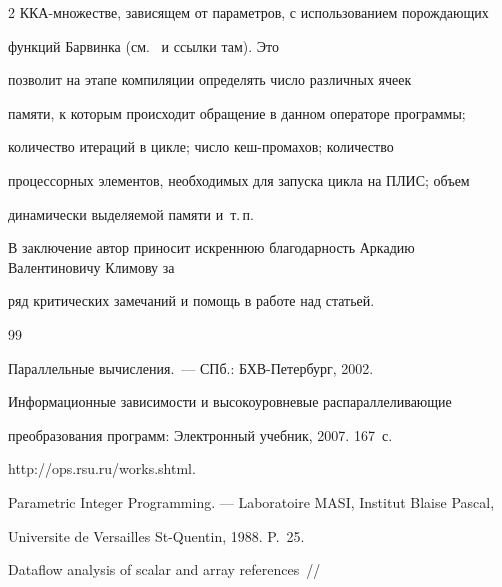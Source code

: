 \begin{multicols}{2}
ККА-мно\-жест\-ве, зависящем от параметров, с использованием порождающих

функций Барвинка (см.~\cite{Verdoolaege3} и ссылки там). Это

позволит на этапе компиляции определять чис\-ло различных ячеек

памяти, к которым происходит обращение в данном операторе программы;

количество итераций в цикле; чис\-ло кеш-про\-ма\-хов; количество

процессорных элементов, необходимых для запуска цикла на ПЛИС; объем

динамически выделяемой памяти и~т.\,п.



\bigskip



В заключение автор приносит искреннюю благодарность Аркадию Валентиновичу Климову за

ряд критических замечаний и помощь в работе над статьей.



{\small\frenchspacing

{%


\begin{thebibliography}{99}






  Параллельные вы\-чис\-ле\-ния.~--- СПб.: БХВ-Петербург, 2002.




 Информационные зависимости и высокоуровневые распараллеливающие 

преобразования программ: Электронный учебник, 2007. 167~с. 

{\sf http://ops.rsu.ru/works.shtml}.




 Parametric Integer Programming. --- Laboratoire MASI, Institut Blaise Pascal, 

Universite  de Versailles St-Quentin, 1988. P.~25.




 Dataflow analysis of scalar and array references~// 


\end{thebibliography}}}
\end{multicols}
